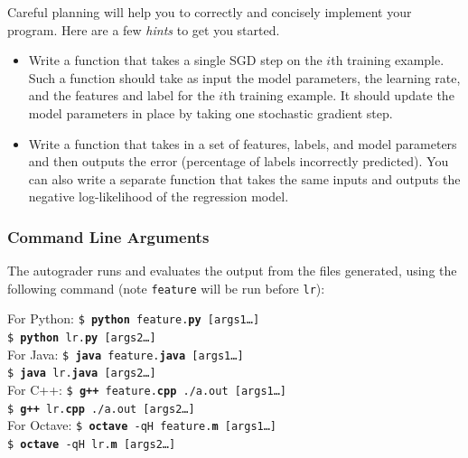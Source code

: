 Careful planning will help you to correctly and concisely implement your program. Here are a few \emph{hints} to get you started.
\begin{itemize}
    \item Write a function that takes a single SGD step on the $i$th training example. Such a function should take as input the model parameters, the learning rate, and the features and label for the $i$th training example. It should update the model parameters in place by taking one stochastic gradient step.
    \item Write a function that takes in a set of features, labels, and model parameters and then outputs the error (percentage of labels incorrectly predicted). You can also write a separate function that takes the same inputs and outputs the negative log-likelihood of the regression model.
\end{itemize}



\subsubsection{Command Line Arguments}
The autograder runs and evaluates the output from the files generated, using the following command (note \lstinline{feature} will be run before \lstinline{lr}):

\begin{tabbing}
For Python: \=\texttt{\$ \textbf{python} feature.\textbf{py} [args1\dots]}\\
\>\texttt{\$ \textbf{python} lr.\textbf{py} [args2\dots]}\\
For Java: \>\texttt{\$ \textbf{java} feature.\textbf{java} [args1\dots]}\\
\>\texttt{\$ \textbf{java} lr.\textbf{java} [args2\dots]}\\
For C++: \>\texttt{\$ \textbf{g++} feature.\textbf{cpp} ./a.out [args1\dots]}\\
\>\texttt{\$ \textbf{g++} lr.\textbf{cpp} ./a.out [args2\dots]}\\
For Octave: \>\texttt{\$ \textbf{octave} -qH feature.\textbf{m} [args1\dots]}\\
\>\texttt{\$ \textbf{octave} -qH lr.\textbf{m} [args2\dots]}
\end{tabbing}

